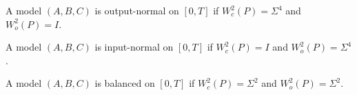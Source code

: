 \begin{definition}
\label{Paper:Moore1981:OutputNorm}
A model $(A,B,C)$ is output-normal on $[0,T]$ if $W_c^2(P)=\Sigma^4$ and $W_o^2(P)=I$.
\end{definition}


\begin{definition}
\label{Paper:Moore1981:InputNorm}
A model $(A,B,C)$ is input-normal on $[0,T]$ if $W_c^2(P)=I$ and $W_o^2(P)=\Sigma^4$.
\end{definition}



\begin{definition}
\label{Paper:Moore1981:BalancedNorm}
A model $(A,B,C)$ is balanced on $[0,T]$ if $W_c^2(P)=\Sigma^2$ and $W_o^2(P)=\Sigma^2$.
\end{definition}